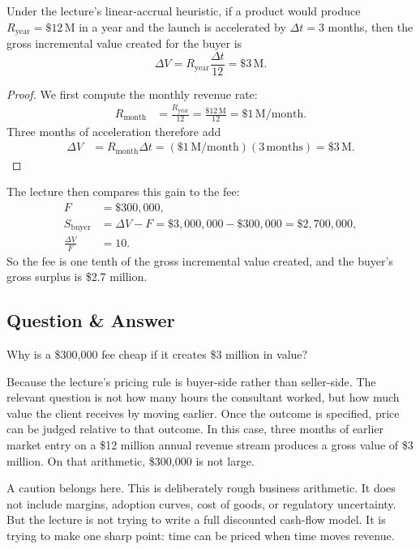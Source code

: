 \begin{proposition}
Under the lecture's linear-accrual heuristic, if a product would produce \(R_{\mathrm{year}} = \$12\,\mathrm{M}\) in a year and the launch is accelerated by \(\Delta t = 3\) months, then the gross incremental value created for the buyer is
\begin{equation}
\Delta V = R_{\mathrm{year}}\frac{\Delta t}{12} = \$3\,\mathrm{M}.
\end{equation}
\end{proposition}

\begin{proof}
We first compute the monthly revenue rate:
\begin{align}
R_{\mathrm{month}}
&= \frac{R_{\mathrm{year}}}{12}
= \frac{\$12\,\mathrm{M}}{12}
= \$1\,\mathrm{M/month}.
\end{align}
Three months of acceleration therefore add
\begin{align}
\Delta V
&= R_{\mathrm{month}}\Delta t
= (\$1\,\mathrm{M/month})(3\,\mathrm{months})
= \$3\,\mathrm{M}.
\end{align}
\end{proof}

The lecture then compares this gain to the fee:
\begin{align}
F &= \$300{,}000,\\
S_{\mathrm{buyer}} &= \Delta V - F = \$3{,}000{,}000 - \$300{,}000 = \$2{,}700{,}000,\\
\frac{\Delta V}{F} &= 10.
\end{align}
So the fee is one tenth of the gross incremental value created, and the buyer's gross surplus is \$2.7 million.

\subsection{Question \& Answer}

Why is a \$300{,}000 fee cheap if it creates \$3 million in value?

Because the lecture's pricing rule is buyer-side rather than seller-side. The relevant question is not how many hours the consultant worked, but how much value the client receives by moving earlier. Once the outcome is specified, price can be judged relative to that outcome. In this case, three months of earlier market entry on a \$12 million annual revenue stream produces a gross value of \$3 million. On that arithmetic, \$300{,}000 is not large.

A caution belongs here. This is deliberately rough business arithmetic. It does not include margins, adoption curves, cost of goods, or regulatory uncertainty. But the lecture is not trying to write a full discounted cash-flow model. It is trying to make one sharp point: time can be priced when time moves revenue.


